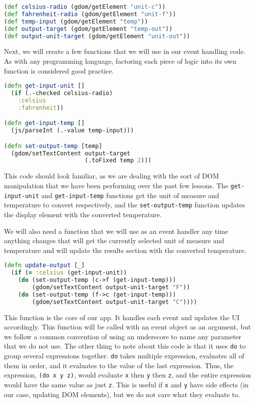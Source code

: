 \documentclass[10pt,twoside,openright]{memoir}
\begin{document}
\begin{lstlisting}[language=Clojure]
(def celsius-radio (gdom/getElement "unit-c"))
(def fahrenheit-radio (gdom/getElement "unit-f"))
(def temp-input (gdom/getElement "temp"))
(def output-target (gdom/getElement "temp-out"))
(def output-unit-target (gdom/getElement "unit-out"))
\end{lstlisting}

Next, we will create a few functions that we will use in our event
handling code. As with any programming language, factoring each piece of
logic into its own function is considered good practice.

\begin{lstlisting}[language=Clojure]
(defn get-input-unit []
  (if (.-checked celsius-radio)
    :celsius
    :fahrenheit))

(defn get-input-temp []
  (js/parseInt (.-value temp-input)))

(defn set-output-temp [temp]
  (gdom/setTextContent output-target
                       (.toFixed temp 2)))
\end{lstlisting}

This code should look familiar, as we are dealing with the sort of DOM
manipulation that we have been performing over the past few lessons. The
\texttt{get-input-unit} and \texttt{get-input-temp} functions get the
unit of measure and temperature to convert respectively, and the
\texttt{set-output-temp} function updates the display element with the
converted temperature.

We will also need a function that we will use as an event handler any
time anything changes that will get the currently selected unit of
measure and temperature and will update the results section with the
converted temperature.

\begin{lstlisting}[language=Clojure]
(defn update-output [_]
  (if (= :celsius (get-input-unit))
    (do (set-output-temp (c->f (get-input-temp)))
        (gdom/setTextContent output-unit-target "F"))
    (do (set-output-temp (f->c (get-input-temp)))
        (gdom/setTextContent output-unit-target "C"))))
\end{lstlisting}

This function is the core of our app. It handles each event and updates
the UI accordingly. This function will be called with an event object as
an argument, but we follow a common convention of using an underscore to
name any parameter that we do not use. The other thing to note about
this code is that it uses \texttt{do} to group several expressions
together. \texttt{do} takes multiple expression, evaluates all of them
in order, and it evaluates to the value of the last expression. Thus,
the expression, \texttt{(do\ x\ y\ z)}, would evaluate \texttt{x} then
\texttt{y} then \texttt{z}, and the entire expression would have the
same value as just \texttt{z}. This is useful if \texttt{x} and
\texttt{y} have side effects (in our case, updating DOM elements), but
we do not care what they evaluate to.
\end{document}
